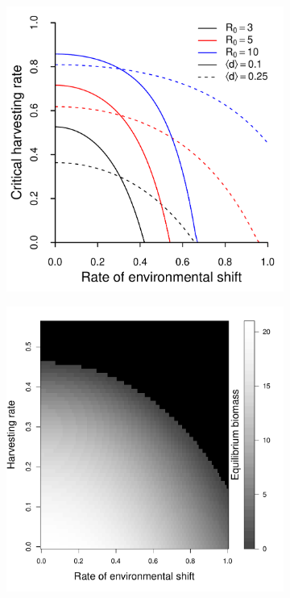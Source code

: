 \documentclass[12pt,english]{article}
\begin{document}
\begin{figure}[htbp]
\begin{subfigure}{3in}
\subcaption{\label{rates}}
\includegraphics[width=\textwidth]{plots/critical_rates.pdf}
\end{subfigure}
\begin{subfigure}{3in}
\subcaption{\label{biomass}}
\includegraphics[width=\textwidth]{plots/eqbiomass.pdf}
\end{subfigure}


\end{figure}
\end{document}
